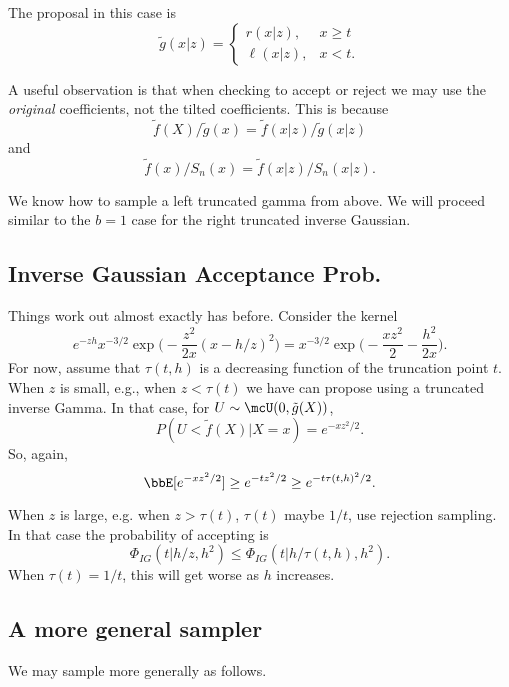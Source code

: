 \documentclass[12pt]{article}
\begin{document}
The proposal in this case is
\[
\tilde g(x|z) = 
\begin{cases}
r(x|z), & x \geq t \\
\ell(x|z), & x < t.
\end{cases}
\]

A useful observation is that when checking to accept or reject we may use the
\emph{original} coefficients, not the tilted coefficients.  This is because
\[
\tilde f(X) / \tilde g(x) = \tilde f(x|z) / \tilde g(x|z)
\]
and
\[
\tilde f(x) / S_n(x) = \tilde f(x|z) / S_n(x|z).
\]

We know how to sample a left truncated gamma from above.  We will proceed
similar to the $b=1$ case for the right truncated inverse Gaussian.

\subsection{Inverse Gaussian Acceptance Prob.}

Things work out almost exactly has before.  Consider the kernel
\[
e^{-zh} x^{-3/2} \exp \Big( -\frac{z^2}{2x} (x - h/z)^2 \Big)
= x^{-3/2} \exp \Big( -\frac{x z^2}{2} - \frac{h^2}{2x} \Big).
\]
For now, assume that $\tau(t,h)$ is a decreasing function of the truncation
point $t$.  When $z$ is small, e.g., when $z < \tau(t)$ we have can propose
using a truncated inverse Gamma.  In that case, for $U \sim \mcU(0, \tilde
g(X))$,
\[
P(U < \tilde f(X) | X=x) = e^{-x z^2 / 2}.
\]
So, again, 
\[
\bbE[e^{-xz^2/2}] \geq e^{-t z^2 / 2} \geq e^{-t \tau(t,h)^2 / 2}.
\]

When $z$ is large, e.g. when $z > \tau(t)$, $\tau(t)$ maybe $1/t$, use rejection
sampling.  In that case the probability of accepting is
\[
\Phi_{IG}(t | h/z, h^2) \leq \Phi_{IG}(t | h / \tau(t,h), h^2).
\]
When $\tau(t) = 1/t$, this will get worse as $h$ increases.

\subsection{A more general sampler}

We may sample more generally as follows.
\end{document}
